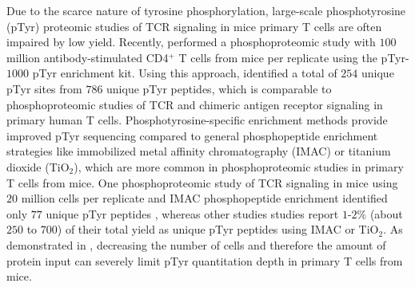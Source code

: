 \documentclass[journal=jprobs,manuscript=article]{achemso}
\begin{document}
Due to the scarce nature of tyrosine phosphorylation, large-scale phosphotyrosine (pTyr) proteomic studies of TCR signaling in mice primary T cells are often impaired by low yield. Recently, \citeauthor{locard2020lymphoatlas} performed a phosphoproteomic study with $100$ million antibody-stimulated CD4$^{+}$ T cells from mice per replicate using the pTyr-$1000$ pTyr enrichment kit. Using this approach, \citeauthor{locard2020lymphoatlas} identified a total of $254$ unique pTyr sites from $786$ unique pTyr peptides, which is comparable to phosphoproteomic studies of TCR and chimeric antigen receptor signaling in primary human T cells\cite{joshi2017phosphoproteomics,salter2021comparative,ramello2019immunoproteomic}. Phosphotyrosine-specific enrichment methods provide improved pTyr sequencing compared to general phosphopeptide enrichment strategies like immobilized metal affinity chromatography (IMAC) or titanium dioxide (TiO$_{2}$), which are more common in phosphoproteomic studies in primary T cells from mice\cite{navarro2011phosphoproteomic,prado2021synergistic}. One phosphoproteomic study of TCR signaling in mice using $20$ million cells per replicate and IMAC phosphopeptide enrichment identified only $77$ unique pTyr peptides \cite{iwai2010quantitative}, whereas other studies studies report $1$-$2\%$ (about $250$ to $700$) of their total yield as unique pTyr peptides using IMAC or TiO$_{2}$\cite{alvarez202023,navarro2011phosphoproteomic}. As demonstrated in \citeauthor{iwai2010quantitative}, decreasing the number of cells and therefore the amount of protein input can severely limit pTyr quantitation depth in primary T cells from mice. 



\end{document}
